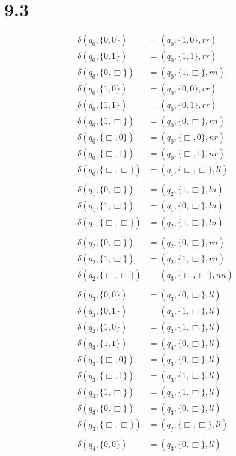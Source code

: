 \documentclass[12pt, a4paper]{article}
\begin{document}
\section*{9.3}
\begin{align*}
\delta(q_0,\{0,0\}) &= (q_0,\{1,0\},rr)\\
\delta(q_0,\{0,1\}) &= (q_0,\{1,1\},rr)\\
\delta(q_0,\{0,\Box\}) &= (q_0,\{1,\Box\},rn)\\
\delta(q_0,\{1,0\}) &= (q_0,\{0,0\},rr)\\
\delta(q_0,\{1,1\}) &= (q_0,\{0,1\},rr)\\
\delta(q_0,\{1,\Box\}) &= (q_0,\{0,\Box\},rn)\\
\delta(q_0,\{\Box,0\}) &= (q_0,\{\Box,0\},nr)\\
\delta(q_0,\{\Box,1\}) &= (q_0,\{\Box,1\},nr)\\
\delta(q_0,\{\Box,\Box\}) &= (q_1,\{\Box,\Box\},ll)\\
\\
\delta(q_1,\{0, \Box\}) &= (q_2, \{1,\Box\}, ln)\\
\delta(q_1,\{1, \Box\}) &= (q_1, \{0,\Box\}, ln)\\
\delta(q_1,\{\Box, \Box\}) &= (q_2, \{1,\Box\}, ln)\\
\\
\delta(q_2,\{0, \Box\}) &= (q_2, \{0, \Box\}, rn)\\
\delta(q_2, \{1, \Box\}) &= (q_2, \{1, \Box\}, rn)\\
\delta(q_2, \{\Box, \Box\}) &= (q_3, \{\Box, \Box\}, nn)\\
\\
\delta(q_3, \{0,0\}) &=(q_3, \{0,\Box\},ll)\\
\delta(q_3, \{0,1\}) &=(q_3, \{1,\Box\},ll)\\
\delta(q_3, \{1,0\}) &=(q_3, \{1,\Box\},ll)\\
\delta(q_3, \{1,1\}) &=(q_4, \{0,\Box\},ll)\\
\delta(q_3, \{\Box,0\}) &=(q_3, \{0,\Box\},ll)\\
\delta(q_3, \{\Box,1\}) &=(q_3, \{1,\Box\},ll)\\
\delta(q_3, \{1,\Box\}) &=(q_3, \{1,\Box\},ll)\\
\delta(q_3, \{0,\Box\}) &=(q_3, \{0,\Box\},ll)\\
\delta(q_3, \{\Box,\Box\}) &=(q_f, \{\Box,\Box\},ll)\\
\\
\delta(q_4, \{0,0\}) &=(q_3, \{0,\Box\},ll)\\

\end{align*}
\end{document}
